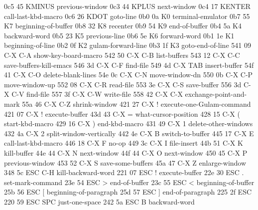 {0c5     45      KMINUS          previous-window
0c3     44      KPLUS           next-window
0c4     17      KENTER          call-last-kbd-macro
0c6     26      KDOT            goto-line
0b0     0a      K0              terminal-emulator
0b7     55      K7              beginning-of-buffer
0b8     32      K8              recenter
0b9     54      K9              end-of-buffer
0b4     5a      K4              backward-word
0b5     23      K5              previous-line
0b6     5e      K6              forward-word
0b1     1e      K1              beginning-of-line
0b2     0f      K2              gulam-forward-line
0b3     1f      K3              goto-end-of-line
541     09      C-X C-A         show-key-board-macro
542     50      C-X C-B         list-buffers
543     12      C-X C-C         save-buffers-kill-emacs
546     3d      C-X C-F         find-file
549     4d      C-X TAB         insert-buffer
54f     41      C-X C-O         delete-blank-lines
54e     0c      C-X C-N         move-window-dn
550     0b      C-X C-P         move-window-up
552     08      C-X C-R         read-file
553     3e      C-X C-S         save-buffer
556     3d      C-X C-V         find-file
557     3f      C-X C-W         write-file
558     42      C-X C-X         exchange-point-and-mark
55a     46      C-X C-Z         shrink-window
421     27      C-X !           execute-one-Gulam-command
421     07      C-X !           execute-buffer
43d     43      C-X =           what-cursor-position
428     15      C-X (           start-kbd-macro
429     16      C-X )           end-kbd-macro
431     49      C-X 1           delete-other-windows
432     4a      C-X 2           split-window-vertically
442     4e      C-X B           switch-to-buffer
445     17      C-X E           call-last-kbd-macro
446     18      C-X F           no-op
449     3c      C-X I           file-insert
44b     51      C-X K           kill-buffer
44e     44      C-X N           next-window
44f     44      C-X O           next-window
450     45      C-X P           previous-window
453     52      C-X S           save-some-buffers
45a     47      C-X Z           enlarge-window
348     5c      ESC C-H         kill-backward-word
221     07      ESC !           execute-buffer
22e     30      ESC .           set-mark-command
23e     54      ESC >           end-of-buffer
23c     55      ESC <           beginning-of-buffer
25b     56      ESC [           beginning-of-paragraph
25d     57      ESC ]           end-of-paragraph
225     2f      ESC %
220     59      ESC SPC         just-one-space
242     5a      ESC B           backward-word
}
